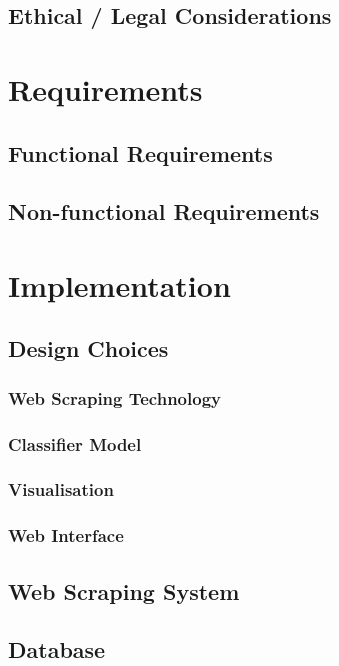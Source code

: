 \documentclass{l4proj}
\begin{document}
\section{Ethical / Legal Considerations}


\chapter{Requirements}
\section{Functional Requirements}
\section{Non-functional Requirements}

\chapter{Implementation}
\section{Design Choices}
\subsection{Web Scraping Technology}
\subsection{Classifier Model}
\subsection{Visualisation}
\subsection{Web Interface}
\section{Web Scraping System}
\section{Database}
\end{document}

